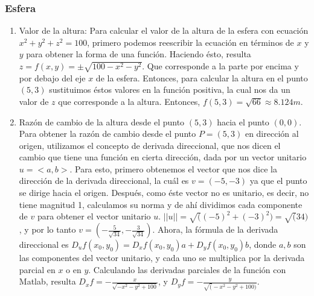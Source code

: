 \documentclass[12pt, letterpaper]{report}
\begin{document}
\subsubsection{Esfera}
\begin{enumerate}
\item Valor de la altura: 
Para calcular el valor de la altura de la esfera con ecuación $x^2 + y^2 + z^2 = 100$, primero podemos 
reescribir la ecuación en términos de $x$ y $y$ para obtener la forma de una función. Haciendo ésto, resulta $z = f(x, y) = \pm \sqrt{100 -x^2 - y^2}$. Que 
corresponde a la parte por encima y por debajo del eje $x$ de la esfera. Entonces, para calcular la altura en el punto $(5, 3)$ sustituimos éstos valores en la función positiva, 
la cual nos da un valor de $z$ que corresponde a la altura. Entonces, $f(5, 3) = \sqrt{66} \approx 8.124m$. 
\item Razón de cambio de la altura desde el punto $(5, 3)$ hacia el punto $(0, 0)$. Para obtener la razón de cambio desde el punto $P = (5, 3)$ en dirección al origen, 
utilizamos el concepto de derivada direccional, que nos dicen el cambio que tiene una función en cierta dirección, dada por un vector unitario $u = <a, b>$. Para esto, primero obtenemos el vector 
que nos dice la dirección de la derivada direccional, la cuál es $v = (-5, -3)$ ya que el punto se dirige hacia el origen. Después, como éste vector no es unitario, es decir, 
no tiene magnitud 1, calculamos su norma y de ahí dividimos cada componente de $v$ para obtener el vector unitario $u$. $||u|| = \sqrt((-5)^2 + (-3)^2) = \sqrt(34)$, y por lo tanto $v = (-\frac{5}{\sqrt{34}}, -\frac{3}{\sqrt{34}})$. 
Ahora, la fórmula de la derivada direccional es $D_uf(x_0, y_0) = D_xf(x_0, y_0)a + D_yf(x_0, y_0)b$, donde $a, b$ son las componentes del 
vector unitario, y cada uno se multiplica por la derivada parcial en $x$ o en $y$. Calculando las derivadas parciales de la función con Matlab, resulta $D_xf = -\frac{x}{\sqrt{-x^2 - y^2 + 100}}$, y $D_yf = -\frac{y}{\sqrt(-x^2 - y^2 + 100)}$. \\ 


\end{enumerate}
\end{document}
